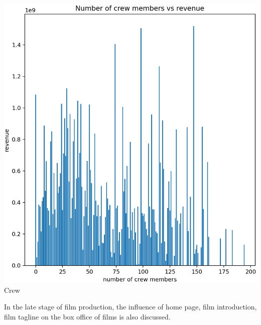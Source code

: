 \begin{center}
\begin{minipage}{0.3\linewidth}
    \includegraphics[width=0.8\linewidth]{figures//crew.eps}\\
  {\small{Crew}}
  \end{minipage}
\end{center}

In the late stage of film production, the influence of home page, film introduction, film tagline on the box office of films is also discussed.


